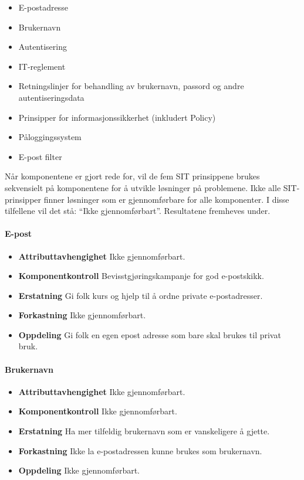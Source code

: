 \begin{itemize}
    \item E-postadresse
    \item Brukernavn
    \item Autentisering
    \item IT-reglement
    \item Retningslinjer for behandling av brukernavn, passord og andre autentiseringsdata
    \item Prinsipper for informasjonssikkerhet (inkludert Policy)
    \item Påloggingssystem
    \item E-post filter
\end{itemize}

Når komponentene er gjort rede for, vil de fem SIT prinsippene brukes sekvensielt på komponentene for å utvikle løsninger på problemene. Ikke alle SIT-prinsipper finner løsninger som er gjennomførbare for alle komponenter. I disse tilfellene vil det stå: ``Ikke gjennomførbart''. Resultatene fremheves under.

\paragraph{E-post}
\begin{itemize}
    \item \textbf{Attributtavhengighet} Ikke gjennomførbart.
    \item \textbf{Komponentkontroll} Bevisstgjøringskampanje for god e-postskikk.
    \item \textbf{Erstatning} Gi folk kurs og hjelp til å ordne private e-postadresser.
    \item \textbf{Forkastning} Ikke gjennomførbart.
    \item \textbf{Oppdeling} Gi folk en egen epost adresse som bare skal brukes til privat bruk.
\end{itemize}

\paragraph{Brukernavn}
\begin{itemize}
    \item \textbf{Attributtavhengighet} Ikke gjennomførbart.
    \item \textbf{Komponentkontroll} Ikke gjennomførbart.
    \item \textbf{Erstatning} Ha mer tilfeldig brukernavn som er vanskeligere å gjette.
    \item \textbf{Forkastning} Ikke la e-postadressen kunne brukes som brukernavn.
    \item \textbf{Oppdeling} Ikke gjennomførbart.
\end{itemize}


